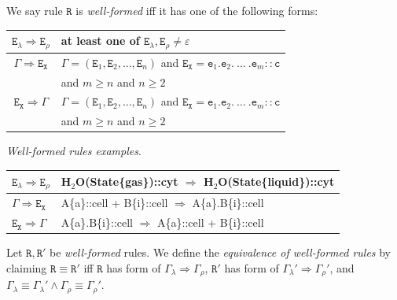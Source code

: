 \documentclass{elsarticle}
\begin{document}
\begin{definition} \label{well}
We say rule $\mathtt{R}$ is \emph{well-formed} iff it has one of the following forms:
\begin{center}
\begin{tabular}{c@{\hskip 1in}l}
	$\mathtt{E}_\lambda \Rightarrow \mathtt{E}_\rho$ & at least one of $\mathtt{E}_\lambda, \mathtt{E}_\rho \neq \varepsilon $\\
	\hline
	$\Gamma \Rightarrow \mathtt{E}_\mathtt{X}$ & $\Gamma = (\mathtt{E}_1, \mathtt{E}_2, \ldots, \mathtt{E}_n) $ and $\mathtt{E}_\mathtt{X} = \mathtt{e}_1.\mathtt{e}_2.~\ldots~.\mathtt{e}_m::\mathtt{c}$ \\
	 & and $ m \geq n $ and $n \geq 2$ \\
	 \hline
	$\mathtt{E}_\mathtt{X} \Rightarrow \Gamma$ & $\Gamma = (\mathtt{E}_1, \mathtt{E}_2, \ldots, \mathtt{E}_n) $ and $\mathtt{E}_\mathtt{X} = \mathtt{e}_1.\mathtt{e}_2.~\ldots~.\mathtt{e}_m::\mathtt{c}$ \\
	 & and $ m \geq n $ and $n \geq 2$\\
\end{tabular}
\end{center}
\end{definition}

\begin{example}\label{well_rules_examples}
\textit{Well-formed rules examples}.

\begin{center}
\begin{tabular}{ l | l } 
	$\mathtt{E}_\lambda \Rightarrow \mathtt{E}_\rho$ & H$_2$O(State\{gas\})::cyt $\Rightarrow$ H$_2$O(State\{liquid\})::cyt \\
	\hline
	$\Gamma \Rightarrow \mathtt{E}_\mathtt{X}$ & A\{a\}::cell + B\{i\}::cell $\Rightarrow$ A\{a\}.B\{i\}::cell \\
	\hline
	$\mathtt{E}_\mathtt{X} \Rightarrow \Gamma$ & A\{a\}.B\{i\}::cell $\Rightarrow$ A\{a\}::cell + B\{i\}::cell \\
\end{tabular}
\end{center}
\end{example}

\begin{definition}
Let $\mathtt{R},\mathtt{R}'$ be \emph{well-formed} rules. We define the \emph{equivalence of well-formed rules} by claiming $\mathtt{R} \equiv \mathtt{R}'$ iff $\mathtt{R}$ has form of $\Gamma_\lambda \Rightarrow \Gamma_\rho$, $\mathtt{R}'$ has form of $\Gamma_\lambda' \Rightarrow \Gamma_\rho'$, and $\Gamma_\lambda \equiv \Gamma_\lambda' \wedge \Gamma_\rho \equiv \Gamma_\rho' $. 
\end{definition}
\end{document}

